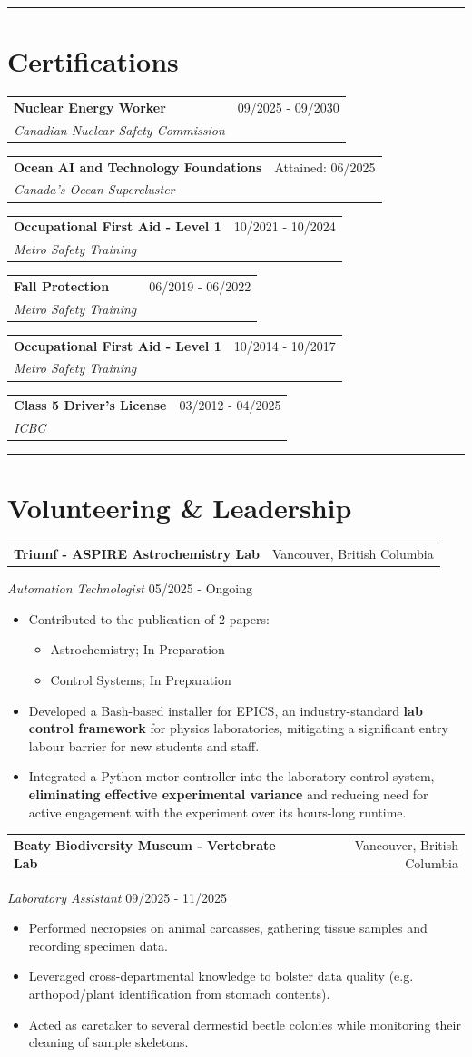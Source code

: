 \documentclass[a4paper,10pt]{article}
\makeatletter
\newcommand{\certification}[3]{
	{
		\vspace{1.5mm}
		\noindent
		\begin{tabular*}{\textwidth}{@{\extracolsep{\fill}} l r}
			\textbf{#1} & #3 \\
			\textit{#2}
		\end{tabular*}
	}
}
\newcommand{\leadership}[5]{
	{
		\vspace{1.5mm}
		\noindent
		\begin{tabular*}{\textwidth}{@{\extracolsep{\fill}} l r}
			\textbf{#1} & #2 \\
		\end{tabular*}
		
		\noindent\textit{#3} \hfill #4 \\
		\vspace{-5mm}
		\begin{itemize}
			
			\setlength{\itemsep}{-1mm}   %
			\setlength{\topsep}{-4mm}
			\setlength{\parsep}{0mm}
			#5
		\end{itemize}
	}
}
\makeatother
\begin{document}
		
\noindent\rule{\textwidth}{0.4pt}
\section*{Certifications}
	\certification
		{Nuclear Energy Worker}
		{Canadian Nuclear Safety Commission}
		{09/2025 - 09/2030}


	\certification
		{Ocean AI and Technology Foundations}
		{Canada's Ocean Supercluster}
		{Attained: 06/2025}
		
	\certification
		{Occupational First Aid - Level 1}
		{Metro Safety Training}
		{10/2021 - 10/2024}
	
	\certification
		{Fall Protection}
		{Metro Safety Training}
		{06/2019 - 06/2022}
		
		
	\certification
		{Occupational First Aid - Level 1}
		{Metro Safety Training}
		{10/2014 - 10/2017}
		
	\certification
		{Class 5 Driver's License}
		{ICBC}
		{03/2012 - 04/2025}

\noindent\rule{\textwidth}{0.4pt}
\section*{Volunteering \& Leadership}

		\leadership
		{Triumf - ASPIRE Astrochemistry Lab}
		{Vancouver, British Columbia}
		{Automation Technologist}
		{05/2025 - Ongoing}
		{
			\item Contributed to the publication of 2 papers: \begin{itemize}\vspace{-0.5em}
				\item Astrochemistry; In Preparation 
				\item Control Systems; In Preparation
			\end{itemize}
			\item Developed a Bash-based installer for EPICS, an industry-standard \textbf{lab control framework }for physics laboratories, mitigating a significant entry labour barrier for new students and staff.
			\item Integrated a Python motor controller into the laboratory control system, \textbf{eliminating effective experimental variance} and reducing need for active engagement with the experiment over its hours-long runtime.
		}

	\leadership
	{Beaty Biodiversity Museum - Vertebrate Lab}
	{Vancouver, British Columbia}
	{Laboratory Assistant}
	{09/2025 - 11/2025}
	{
		\item Performed necropsies on animal carcasses, gathering tissue samples and recording specimen data.
		\item Leveraged cross-departmental knowledge to bolster data quality (e.g. arthopod/plant identification from stomach contents).
		\item Acted as caretaker to several dermestid beetle colonies while monitoring their cleaning of sample skeletons.
	}
	
\end{document}
